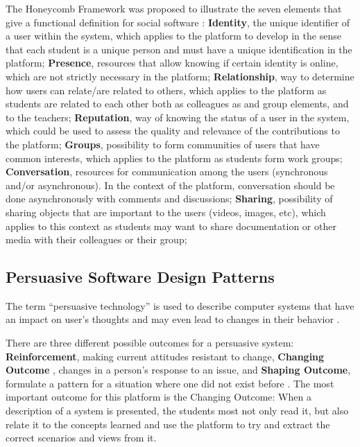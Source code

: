 \documentclass{llncs}
\begin{document}
The Honeycomb Framework was proposed to illustrate the seven elements that give a functional definition for social software \cite{smith2007social}: \textbf{Identity}, the unique identifier of a user within the system, which applies to the platform to develop in the sense that each student is a unique person and must have a unique identification in the platform; \textbf{Presence}, resources that allow knowing if certain identity is online, which are not strictly necessary in the platform; \textbf{Relationship}, way to determine how users can relate/are related to others, which applies to the platform as students are related to each other both as colleagues as and group elements, and to the teachers; \textbf{Reputation}, way of knowing the status of a user in the system, which could be used to assess the quality and relevance of the contributions to the platform; \textbf{Groups}, possibility to form communities of users that have common interests, which applies to the platform as students form work groups; \textbf{Conversation}, resources for communication among the users (synchronous and/or asynchronous). In the context of the platform, conversation should be done asynchronously with comments and discussions; \textbf{Sharing}, possibility of sharing objects that are important to the users (videos, images, etc), which applies to this context as students may want to share documentation or other media with their colleagues or their group;

\subsection{Persuasive Software Design Patterns}
The term ``persuasive technology'' is used to describe computer systems that have an impact on user's thoughts and may even lead to changes in their behavior \cite{fogg2002persuasive,oinas2009persuasive}.

There are three different possible outcomes for a persuasive system: \textbf{Reinforcement}, making current attitudes resistant to change, \textbf{Changing Outcome }, changes in a person's response to an issue, and \textbf{Shaping Outcome}, formulate a pattern for a situation where one did not exist before \cite{oinas2008towards}. The most important outcome for this platform is the Changing Outcome: When a description of a system is presented, the students most not only read it, but also relate it to the concepts learned and use the platform to try and extract the correct scenarios and views from it.
\end{document}
